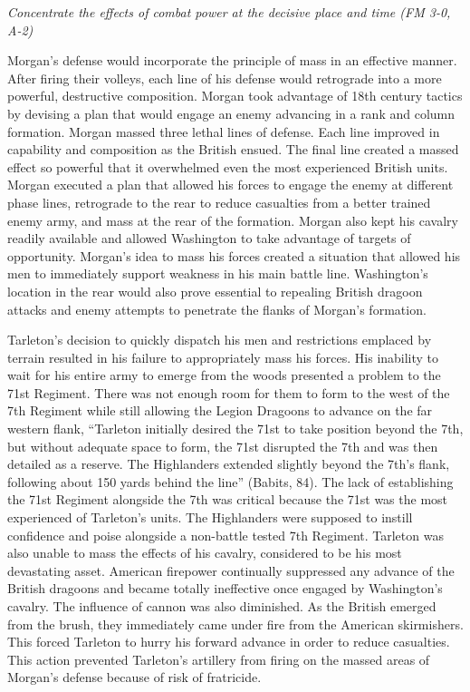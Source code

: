 \textit{Concentrate the effects of combat power at the decisive place and time (FM 3-0, A-2)}

Morgan’s defense would incorporate the principle of mass in an effective
manner.  After firing their volleys, each line of his defense would retrograde
into a more powerful, destructive composition.  Morgan took advantage of 18th
century tactics by devising a plan that would engage an enemy advancing in a
rank and column formation.  Morgan massed three lethal lines of defense.  Each
line improved in capability and composition as the British ensued.  The final
line created a massed effect so powerful that it overwhelmed even the most
experienced British units.  Morgan executed a plan that allowed his forces to
engage the enemy at different phase lines, retrograde to the rear to reduce
casualties from a better trained enemy army, and mass at the rear of the
formation.  Morgan also kept his cavalry readily available and allowed
Washington to take advantage of targets of opportunity.  Morgan’s idea to mass
his forces created a situation that allowed his men to immediately support
weakness in his main battle line.  Washington’s location in the rear would also
prove essential to repealing British dragoon attacks and enemy attempts to
penetrate the flanks of Morgan’s formation.   

Tarleton’s decision to quickly dispatch his men and restrictions emplaced by
terrain resulted in his failure to appropriately mass his forces.   His
inability to wait for his entire army to emerge from the woods presented a
problem to the 71st Regiment.  There was not enough room for them to form to
the west of the 7th Regiment while still allowing the Legion Dragoons to
advance on the far western flank, “Tarleton initially desired the 71st to take
position beyond the 7th, but without adequate space to form, the 71st disrupted
the 7th and was then detailed as a reserve.  The Highlanders extended slightly
beyond the 7th’s flank, following about 150 yards behind the line” (Babits,
84).  The lack of establishing the 71st Regiment alongside the 7th was critical
because the 71st was the most experienced of Tarleton’s units.  The Highlanders
were supposed to instill confidence and poise alongside a non-battle tested 7th
Regiment.  Tarleton was also unable to mass the effects of his cavalry,
considered to be his most devastating asset.  American firepower continually
suppressed any advance of the British dragoons and became totally ineffective
once engaged by Washington’s cavalry.  The influence of cannon was also
diminished.  As the British emerged from the brush, they immediately came under
fire from the American skirmishers.  This forced Tarleton to hurry his forward
advance in order to reduce casualties.  This action prevented Tarleton’s
artillery from firing on the massed areas of Morgan’s defense because of risk
of fratricide.   

